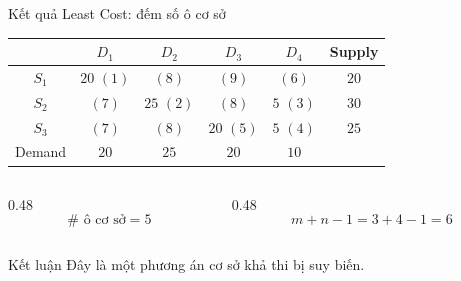 \documentclass[10pt]{beamer}
\begin{document}
\begin{frame}{Kết quả Least Cost: đếm số ô cơ sở}
    \centering
    \renewcommand{\arraystretch}{1.25}
    \begin{tabular}{c|cccc|c}
        & $D_1$ & $D_2$ & $D_3$ & $D_4$ & Supply\\
        \hline
        $S_1$ & \cellcolor{occupied}$20$ {\scriptsize $(1)$} & {\scriptsize $(8)$} & {\scriptsize $(9)$} & {\scriptsize $(6)$} & $20$\\
        $S_2$ & {\scriptsize $(7)$} & \cellcolor{occupied}$25$ {\scriptsize $(2)$} & {\scriptsize $(8)$} & \cellcolor{occupied}$5$ {\scriptsize $(3)$} & $30$\\
        $S_3$ & {\scriptsize $(7)$} & {\scriptsize $(8)$} & \cellcolor{occupied}$20$ {\scriptsize $(5)$} & \cellcolor{occupied}$5$ {\scriptsize $(4)$} & $25$\\
        \hline
        Demand & $20$ & $25$ & $20$ & $10$ &
    \end{tabular}

    \vspace{0.35cm}
    \begin{columns}[T]
        \begin{column}{0.48\textwidth}
            \[
                \#\text{ ô cơ sở}=5
            \]
        \end{column}
        \begin{column}{0.48\textwidth}
            \[
                m+n-1=3+4-1=6
            \]
        \end{column}
    \end{columns}

    \vspace{0.15cm}
    \begin{alertblock}{Kết luận}
        Đây là một phương án cơ sở khả thi bị suy biến.
    \end{alertblock}
\end{frame}
\end{document}
